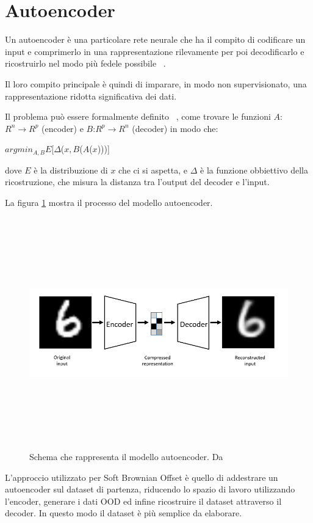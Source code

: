 \section{Autoencoder} 

Un autoencoder è una particolare rete neurale che ha il compito di codificare un input e comprimerlo in una rappresentazione rilevamente per poi decodificarlo e ricostruirlo nel modo più fedele possibile ~\cite{bankAutoencoders2021}.

Il loro compito principale è quindi di imparare, in modo non supervisionato, una rappresentazione ridotta significativa dei dati.

Il problema può essere formalmente definito ~\cite{baldiAutoencodersUnsupervisedLearning}, come trovare le funzioni $A$:$ R^{n} \rightarrow R^p$ (encoder) e $B$:$ R^{p} \rightarrow R^n$ (decoder) in modo che:

\begin{center}
$arg min_{A,B} E$[$\Delta$($x,  B$($A$($x$)))] \\
\end{center}

dove $E$ è la distribuzione di $x$ che ci si aspetta, e $\Delta$ è la funzione obbiettivo della ricostruzione, che misura la distanza tra l'output del decoder e l'input.

La figura \ref{fig:ae_schema} mostra il processo del modello autoencoder.

\begin{figure}[htpb]
    \centering
    \includegraphics[width=\textwidth,height=10cm,keepaspectratio=true]{img/ae_schema.png}
    \caption{
        Schema che rappresenta il modello autoencoder. Da ~\cite{baldiAutoencodersUnsupervisedLearning}
    }
    \label{fig:ae_schema}
\end{figure}


L'approccio utilizzato per Soft Brownian Offset è quello di addestrare un autoencoder sul dataset di partenza, riducendo lo spazio di lavoro utilizzando l'encoder, generare i dati OOD ed infine ricostruire il dataset attraverso il decoder. In questo modo il dataset è più semplice da elaborare.



